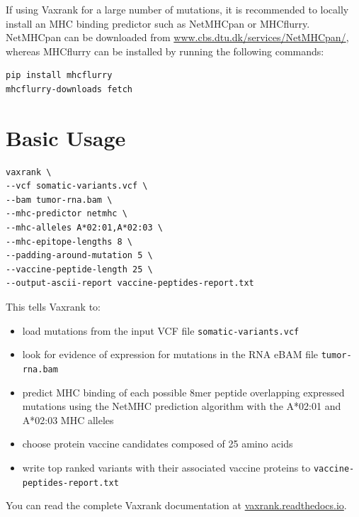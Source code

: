 \documentclass[10pt,letterpaper]{article}
\begin{document}
If using Vaxrank for a large number of mutations, it is recommended to locally install an MHC binding predictor such as NetMHCpan or MHCflurry. NetMHCpan can be downloaded from \href{http://www.cbs.dtu.dk/services/NetMHCpan/}{www.cbs.dtu.dk/services/NetMHCpan/}, whereas MHCflurry can be installed by running the following commands:

\begin{verbatim}
pip install mhcflurry
mhcflurry-downloads fetch
\end{verbatim}

\section*{Basic Usage}

\begin{verbatim}
vaxrank \
--vcf somatic-variants.vcf \
--bam tumor-rna.bam \
--mhc-predictor netmhc \
--mhc-alleles A*02:01,A*02:03 \
--mhc-epitope-lengths 8 \
--padding-around-mutation 5 \
--vaccine-peptide-length 25 \
--output-ascii-report vaccine-peptides-report.txt
\end{verbatim}

This tells Vaxrank to:
\begin{itemize}
	\item load mutations from the input VCF file \verb|somatic-variants.vcf| 
	\item look for evidence of expression for mutations in the RNA eBAM file \verb|tumor-rna.bam|
	\item predict MHC binding of each possible 8mer peptide overlapping expressed mutations  using the NetMHC prediction algorithm with the A*02:01 and A*02:03 MHC alleles
	\item choose protein vaccine candidates composed of 25 amino acids
	\item write top ranked variants with their associated vaccine proteins to \verb|vaccine-peptides-report.txt|
\end{itemize}

You can read the complete Vaxrank documentation at \href{http://vaxrank.readthedocs.io}{vaxrank.readthedocs.io}.
\end{document}
